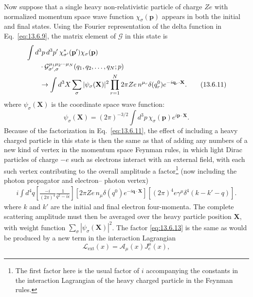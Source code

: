 Now suppose that a single heavy non-relativistic particle of charge $Ze$
with normalized momentum space wave function $\chi_\sigma(\mathbf p)$ appears in both
the initial and final states. Using the Fourier representation of the delta
function in Eq.~\eqref{eq:13.6.9}, the matrix element of $\mathcal G$ in this state is
\begin{align}
&\int d^3p\,d^3p'\,\chi^*_{\sigma'}(\mathbf p')\chi_\sigma(\mathbf p)
\notag\\
&\qquad\cdot
\mathcal G^{\mu_1\mu_2\cdots\mu_N}_{\sigma',\sigma}
(q_1,q_2,\ldots,q_N;p)
\notag\\
&\qquad\to
\int d^3X\sum_\sigma|\psi_\sigma(\mathbf X)|^2
\prod_{r=1}^N 2\pi Ze\,n^{\mu_r}\delta(q_r^0)e^{-i\mathbf q_r\cdot\mathbf X}.
\tag{13.6.11}\label{eq:13.6.11}
\end{align}
where $\psi_\sigma(\mathbf X)$ is the coordinate space wave function:
\begin{equation}
\psi_\sigma(\mathbf X)=(2\pi)^{-3/2}\int d^3p\,
\chi_\sigma(\mathbf p)e^{i\mathbf p\cdot\mathbf X}.
\tag{13.6.12}\label{eq:13.6.12}
\end{equation}
Because of the factorization in Eq.~\eqref{eq:13.6.11}, the effect of including a
heavy charged particle in this state is then the same as that of adding
any numbers of a new kind of vertex in the momentum space Feynman
rules, in which light Dirac particles of charge $-e$ such as electrons interact
with an external field, with each such vertex contributing to the overall
amplitude a factor\footnote{The first factor here is the usual factor of $i$ accompanying the constants in the interaction
Lagrangian of the heavy charged particle in the Feynman rules.} (now including the photon propagator and electron--
photon vertex)
\begin{align}
i\int d^4q\left[\frac{-i}{(2\pi)^4}\frac{1}{q^2-i\epsilon}\right]
\left[2\pi Ze\,n_\mu\delta(q^0)e^{-i\mathbf q\cdot\mathbf X}\right]
\left[(2\pi)^4e\gamma^\mu\delta^4(k-k'-q)\right].
\tag{13.6.13}\label{eq:13.6.13}
\end{align}
where $k$ and $k'$ are the initial and final electron four-momenta. The
complete scattering amplitude must then be averaged over the heavy
particle position $\mathbf X$, with weight function $\sum_\sigma|\psi_\sigma(\mathbf X)|^2$. The factor \eqref{eq:13.6.13}
is the same as would be produced by a new term in the interaction
Lagrangian
\begin{equation}
\mathcal L_{\mathrm{ext}}(x)=\mathcal A_\mu(x)J_e^\mu(x),
\tag{13.6.14}\label{eq:13.6.14}
\end{equation}
